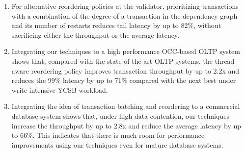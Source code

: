 \begin{enumerate}[leftmargin=*, nolistsep]
\item For alternative reordering policies at the validator, prioritizing transactions with a combination of the degree of a transaction in the dependency graph and its number of restarts reduces tail latency by up to 82\%, without sacrificing either the throughput or the average latency.


\item Integrating our techniques to a high performance OCC-based OLTP system shows that, compared with the-state-of-the-art OLTP systems, the thread-aware reordering policy improves transaction throughput by up to 2.2x and reduces the 99\% latency by up to 71\% compared with the next best under write-intensive YCSB workload.

\item Integrating the idea of transaction batching and reordering to a commercial database system shows that, under high data contention, our techniques increase the throughput by up to 2.8x and reduce the average latency by up to 66\%. This indicates that there is much room for performance improvements using our techniques even for mature database systems.
\end{enumerate}  
